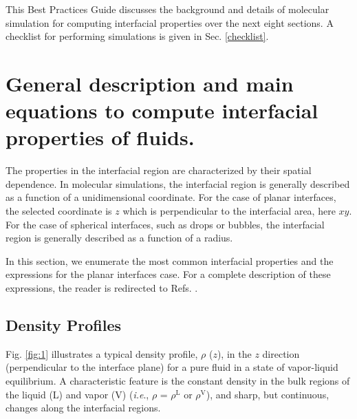 \documentclass[9pt,bestpractices]{livecoms}
\begin{document}
This Best Practices Guide discusses the background and details of molecular simulation for computing interfacial properties over the next eight sections. A checklist for performing simulations is given in Sec. \ref{checklist}.

\section{General description and main equations to compute interfacial properties of fluids.}

The properties in the interfacial region are characterized by their spatial
dependence. In molecular simulations, the interfacial region is generally
described as a function of a unidimensional coordinate. For the case of planar
interfaces, the selected coordinate is $z$ which is perpendicular to the
interfacial area, here $xy$. For the case of spherical interfaces, such
as drops or bubbles, the interfacial region is generally described as
a function of a radius.

In this section, we enumerate the most common interfacial properties and the
expressions for the planar interfaces case. For a complete description of
these expressions, the reader is redirected to Refs. \citep{allen2017,gray2011}.

\subsection{Density Profiles}

Fig. \ref{fig:1} illustrates a typical density profile, ${\rho}$ ($z$), in the
$z$ direction (perpendicular to the interface plane) for a pure fluid
in a state of vapor-liquid equilibrium. A characteristic feature is the
constant density in the bulk regions of the liquid (L) and vapor (V)
(\textit{i.e}., ${\rho}$ = ${\rho}^{\mathrm{L}}$ or ${\rho}^{\mathrm{V}}$),
and  sharp, but continuous, changes along the interfacial regions. 
\end{document}
